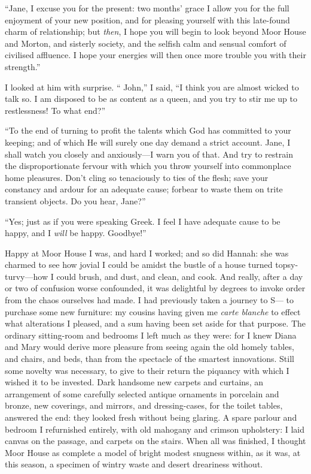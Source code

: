 \enquote{Jane, I excuse you for the present: two months' grace I allow you for
the full enjoyment of your new position, and for pleasing yourself with
this late-found charm of relationship; but \emph{then}, I hope you will
begin to look beyond Moor House and Morton, and sisterly society, and
the selfish calm and sensual comfort of civilised affluence. I hope
your energies will then once more trouble you with their strength.}

I looked at him with surprise. \enquote{\St{} John,} I said, \enquote{I
think you are almost wicked to talk so. I am disposed to be as content
as a queen, and you try to stir me up to restlessness! To what end?}

\enquote{To the end of turning to profit the talents which God has
committed to your keeping; and of which He will surely one day demand a
strict account. Jane, I shall watch you closely and anxiously---I warn
you of that. And try to restrain the disproportionate fervour with
which you throw yourself into commonplace home pleasures. Don't cling
so tenaciously to ties of the flesh; save your constancy and ardour for
an adequate cause; forbear to waste them on trite transient objects. Do
you hear, Jane?}

\enquote{Yes; just as if you were speaking Greek. I feel I have adequate cause
to be happy, and I \emph{will} be happy. Goodbye!}

Happy at Moor House I was, and hard I worked; and so did Hannah: she was
charmed to see how jovial I could be amidst the bustle of a house turned
topsy-turvy---how I could brush, and dust, and clean, and cook. And
really, after a day or two of confusion worse confounded, it was
delightful by degrees to invoke order from the chaos ourselves had
made. I had previously taken a journey to S--- to purchase some new
furniture: my cousins having given me \emph{carte blanche} to effect
what alterations I pleased, and a sum having been set aside for that
purpose. The ordinary sitting-room and bedrooms I left much as they
were: for I knew Diana and Mary would derive more pleasure from seeing
again the old homely tables, and chairs, and beds, than from the
spectacle of the smartest innovations. Still some novelty was
necessary, to give to their return the piquancy with which I wished it
to be invested. Dark handsome new carpets and curtains, an arrangement
of some carefully selected antique ornaments in porcelain and bronze,
new coverings, and mirrors, and dressing-cases, for the toilet tables,
answered the end: they looked fresh without being glaring. A spare
parlour and bedroom I refurnished entirely, with old mahogany and
crimson upholstery: I laid canvas on the passage, and carpets on the
stairs. When all was finished, I thought Moor House as complete a model
of bright modest snugness within, as it was, at this season, a specimen
of wintry waste and desert dreariness without.

